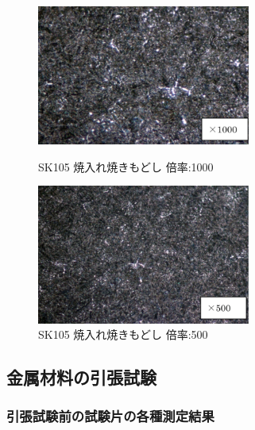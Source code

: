 \documentclass[10pt,a4j]{jsarticle}
\begin{document}
  \begin{figure}[htbp]
    \begin{minipage}{0.5\hsize}
      \begin{center}
        \includegraphics[width=7cm]{../img/SK105_yakiiremodoshi_1000.png}
        \caption{SK105 焼入れ焼きもどし 倍率:1000}
      \end{center}
    \end{minipage}
    \begin{minipage}{0.5\hsize}
      \begin{center}
        \includegraphics[width=7cm]{../img/SK105_yakiiremodoshi_500.png}
        \caption{SK105 焼入れ焼きもどし 倍率:500}
      \end{center}
    \end{minipage}
  \end{figure}
  \subsection{金属材料の引張試験}
  \subsubsection{引張試験前の試験片の各種測定結果}
\end{document}
